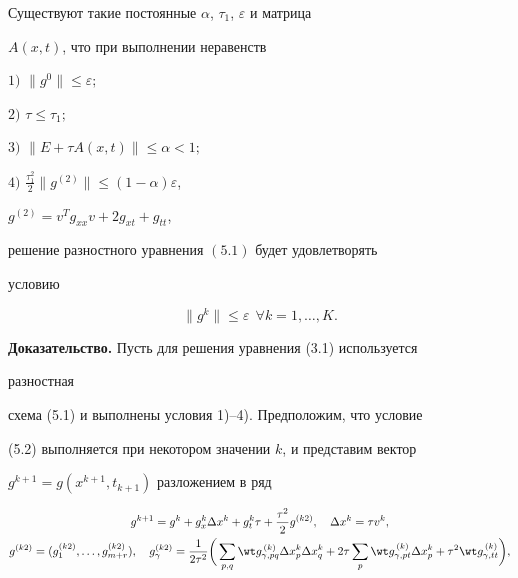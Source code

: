 \begin{thm} 


Существуют такие постоянные $\alpha$, $\tau_1$, $\varepsilon$ и матрица 


$A(x,t)$, что при выполнении неравенств 


 


$1)$ $\|g^0\|\le\varepsilon;$ 


 


$2)$ $\tau\le\tau_1;$ 


 


$3)$ $\|E+\tau A(x,t)\|\le\alpha<1;$ 


 


$4)$ $\frac{\tau^2_1}{2}\|g^{(2)}\|\le(1-\alpha)\varepsilon$, 


$g^{(2)}=v^T g_{x x}v+2g_{x t}+g_{t t}$, 


 


\noindent{}решение разностного уравнения $(5.1)$ будет удовлетворять 


условию 


\begin{equation} 


\|g^k\|\le\varepsilon\ \ \forall k=1,\dotsc,K. 


\end{equation} 


\end{thm} 


 


{\bf Доказательство.} Пусть для решения уравнения (3.1) используется 


разностная 


схема (5.1) и выполнены условия 1)--4). Предположим, что условие 


(5.2) выполняется при некотором значении $k$, и представим вектор 


$g^{k+1}=g(x^{k+1},t_{k+1})$ разложением в ряд 


\begin{gather} 


g^{k+1}=g^k+g^k_x\Delta x^k+g^k_t\tau+\frac{\tau^2}{2} 


g^{(k2)},\quad \Delta x^k=\tau v^k, \\ 


% 


g^{(k2)}=(g^{(k2)}_1,\dotsc,g^{(k2)}_{m+r}),\quad 


g^{(k2)}_\gamma=\frac{1}{2\tau^2}\bigg(\sum_{p,q} 


\wt g^{\,(k)}_{\gamma,p q}\Delta x^k_p \Delta x^k_q+2\tau\sum_p 


\wt g^{\,(k)}_{\gamma,p t}\Delta x^k_p+\tau^2 


\wt g^{\,(k)}_{\gamma,t t}\bigg),\notag 


\end{gather} 


